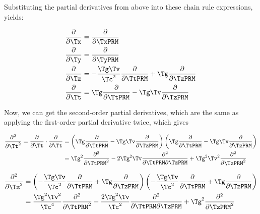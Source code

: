 \begin{derivation}
	Substituting the partial derivatives from above into these chain rule expressions, yields:

	\begin{equation}
		\begin{aligned}
			\frac{\partial}{\partial \Tx } & = \frac{\partial}{\partial \TxPRM }                                                             \\
			\frac{\partial}{\partial \Ty } & = \frac{\partial}{\partial \TyPRM }                                                             \\
			\frac{\partial}{\partial \Tz } & = -\frac{\Tg  \Tv }{\Tc ^2} \frac{\partial}{\partial \TtPRM } + \Tg  \frac{\partial}{\partial \TzPRM } \\
			\frac{\partial}{\partial \Tt } & = \Tg  \frac{\partial}{\partial \TtPRM } - \Tg  \Tv  \frac{\partial}{\partial \TzPRM }
		\end{aligned}
	\end{equation}

	Now, we can get the second-order partial derivatives, which are the same as applying the first-order partial derivative twice, which gives

	\begin{equation}
		\begin{aligned}
			\frac{\partial^2}{\partial \Tt ^2} = \frac{\partial}{\partial \Tt } \cdot \frac{\partial}{\partial \Tt } & = \left(\Tg  \frac{\partial}{\partial \TtPRM } - \Tg  \Tv  \frac{\partial}{\partial \TzPRM }\right) \left(\Tg  \frac{\partial}{\partial \TtPRM } - \Tg  \Tv  \frac{\partial}{\partial \TzPRM }\right) \\
			                                                                                                & = \Tg ^2 \frac{\partial^2}{\partial \TtPRM ^2} - 2\Tg ^2 \Tv  \frac{\partial^2}{\partial \TtPRM \partial \TzPRM } + \Tg ^2 \Tv ^2 \frac{\partial^2}{\partial \TzPRM ^2}
		\end{aligned}
	\end{equation}

	\begin{equation}
		\begin{aligned}
			\frac{\partial^2}{\partial \Tz ^2} & = \left(-\frac{\Tg  \Tv }{\Tc ^2} \frac{\partial}{\partial \TtPRM } + \Tg  \frac{\partial}{\partial \TzPRM }\right) \left(-\frac{\Tg  \Tv }{\Tc ^2} \frac{\partial}{\partial \TtPRM } + \Tg  \frac{\partial}{\partial \TzPRM }\right) \\
			                                & = \frac{\Tg ^2 \Tv ^2}{\Tc ^4} \frac{\partial^2}{\partial \TtPRM ^2} - \frac{2\Tg ^2 \Tv }{\Tc ^2} \frac{\partial^2}{\partial \TtPRM \partial \TzPRM } + \Tg ^2 \frac{\partial^2}{\partial \TzPRM ^2}
		\end{aligned}
	\end{equation}


\end{derivation}
